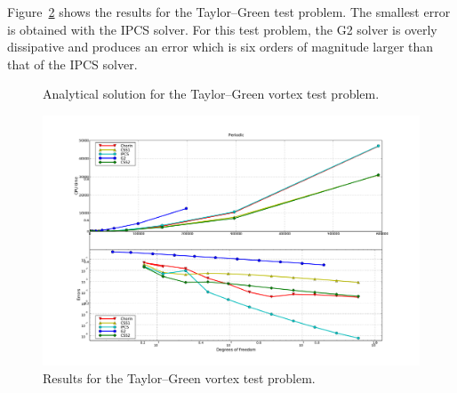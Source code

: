 Figure~\ref{fig:periodic_res} shows the results for the Taylor--Green
test problem. The smallest error is obtained with the IPCS solver. For
this test problem, the G2 solver is overly dissipative and produces an
error which is six orders of magnitude larger than that of the IPCS
solver.

\begin{figure}
  \begin{center}
    \caption{Analytical solution for the Taylor--Green vortex test problem.}
    \label{fig:periodic}
  \end{center}
\end{figure}

\begin{figure}
  \begin{center}
    \includegraphics[width=14cm]{chapters/kvs-1/pdf/new_periodic_res.pdf}
    \caption{Results for the Taylor--Green vortex test problem.}
    \label{fig:periodic_res}
  \end{center}
\end{figure}

